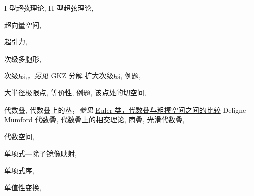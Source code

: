 \begin{theindex}
\subitem \leavevmode\hypertarget{idx:1307}{I 型超弦理论},\enspace{}
\subitem \leavevmode\hypertarget{idx:1308}{II 型超弦理论},\enspace{}
\indexspace
\item \leavevmode\hypertarget{idx:1313}{超向量空间},\enspace{}
\indexspace
\item \leavevmode\hypertarget{idx:1298}{超引力},\enspace{}
\indexspace
\item \leavevmode\hypertarget{idx:1242}{次级多胞形},\enspace{}
\indexspace
\item \leavevmode\hypertarget{idx:1239}{次级扇},\enspace{}，\textit{另见} \hyperlink{idx:0446}{GKZ 分解}
\subitem \leavevmode\hypertarget{idx:1240}{扩大次级扇},\enspace{}
\subitem \leavevmode\hypertarget{idx:1241}{例题},\enspace{}
\indexspace
\item \leavevmode\hypertarget{idx:0696}{大半径极限点},\enspace{}
\subitem \leavevmode\hypertarget{idx:0697}{等价性},\enspace{}
\subitem \leavevmode\hypertarget{idx:0698}{例题},\enspace{}
\subitem \leavevmode\hypertarget{idx:0699}{该点处的切空间},\enspace{}
\indexspace
\item \leavevmode\hypertarget{idx:0040}{代数叠},\enspace{}
\subitem \leavevmode\hypertarget{idx:0041}{代数叠上的丛}，\textit{参见} \hyperlink{idx:0261}{Euler 类，代数叠与粗模空间之间的比较}
\subitem \leavevmode\hypertarget{idx:0042}{Deligne--Mumford 代数叠},\enspace{}
\subitem \leavevmode\hypertarget{idx:0043}{代数叠上的相交理论},\enspace{}
\subitem \leavevmode\hypertarget{idx:0044}{商叠},\enspace{}
\subitem \leavevmode\hypertarget{idx:0045}{光滑代数叠},\enspace{}
\indexspace
\item \leavevmode\hypertarget{idx:0039}{代数空间},\enspace{}
\indexspace
\item \leavevmode\hypertarget{idx:0910}{单项式—除子镜像映射},\enspace{}
\indexspace
\item \leavevmode\hypertarget{idx:0909}{单项式序},\enspace{}
\indexspace
\item \leavevmode\hypertarget{idx:0901}{单值性变换},\enspace{}

\end{theindex}
